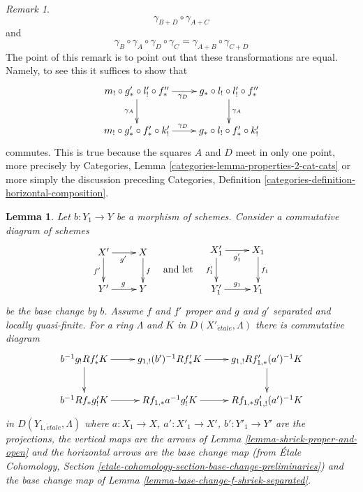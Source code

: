 \documentclass{stacks-project}
\theoremstyle{plain}
\newtheorem{lemma}[subsection]{Lemma}
\theoremstyle{definition}
\theoremstyle{remark}
\newtheorem{remark}[subsection]{Remark}
\numberwithin{equation}{subsection}
\def\etale{{\acute{e}tale}}
\begin{document}
\begin{remark}
$$\gamma_{B + D} \circ \gamma_{A + C}
$$
and
$$
\gamma_B \circ \gamma_A \circ \gamma_D \circ \gamma_C =
\gamma_{A + B} \circ \gamma_{C + D}
$$
The point of this remark is to point out that these transformations
are equal. Namely, to see this it suffices to show that
$$
\xymatrix{
m_! \circ g'_* \circ l'_! \circ f''_* \ar[r]_{\gamma_D} \ar[d]_{\gamma_A} &
g_* \circ l_! \circ l'_! \circ f''_* \ar[d]^{\gamma_A} \\
m_! \circ g'_* \circ f'_* \circ k'_! \ar[r]^{\gamma_D} &
g_* \circ l_! \circ f'_* \circ k'_!
}
$$
commutes. This is true because the squares $A$ and $D$ meet in only
one point, more precisely by
Categories, Lemma \ref{categories-lemma-properties-2-cat-cats}
or more simply the discussion preceding
Categories, Definition \ref{categories-definition-horizontal-composition}.
\end{remark}

\begin{lemma}
\label{lemma-shriek-proper-and-open-base-change}
Let $b : Y_1 \to Y$ be a morphism of schemes. Consider a commutative diagram
of schemes
$$
\vcenter{
\xymatrix{
X' \ar[r]_{g'} \ar[d]_{f'} & X \ar[d]^f \\
Y' \ar[r]^g & Y
}
}
\quad\text{and let}\quad
\vcenter{
\xymatrix{
X'_1 \ar[r]_{g'_1} \ar[d]_{f'_1} & X_1 \ar[d]^{f_1} \\
Y'_1 \ar[r]^{g_1} & Y_1
}
}
$$
be the base change by $b$. Assume $f$ and $f'$ proper and
$g$ and $g'$ separated and locally quasi-finite.
For a ring $\Lambda$ and $K$ in $D(X'_\etale, \Lambda)$
there is commutative diagram
$$
\xymatrix{
b^{-1}g_!Rf'_*K \ar[d] \ar[r] &
g_{1, !}(b')^{-1}Rf'_*K \ar[r] &
g_{1, !}Rf'_{1, *}(a')^{-1}K \ar[d] \\
b^{-1}Rf_*g'_!K \ar[r] &
Rf_{1, *}a^{-1}g'_!K \ar[r] &
Rf_{1, *}g'_{1, !}(a')^{-1}K
}
$$
in $D(Y_{1, \etale}, \Lambda)$ where $a : X_1 \to X$, $a' : X'_1 \to X'$,
$b' : Y'_1 \to Y'$ are the projections, the vertical maps are the arrows
of Lemma \ref{lemma-shriek-proper-and-open}
and the horizontal arrows are the base change map
(from \'Etale Cohomology, Section
\ref{etale-cohomology-section-base-change-preliminaries})
and the base change map of Lemma \ref{lemma-base-change-f-shriek-separated}.
\end{lemma}
\end{document}
